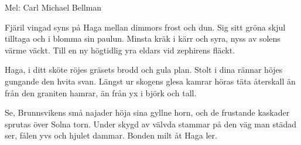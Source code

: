 \begin{SongText}
\begin{SongInfo}
    Mel: Carl Michael Bellman
\end{SongInfo}
\begin{SongVerse}
Fjäril vingad syns på Haga
mellan dimmors frost och dun.
Sig sitt gröna skjul tilltaga
och i blomma sin paulun.
Minsta kräk i kärr och syra,
nyss av solens värme väckt.
Till en ny högtidlig yra
eldars vid zephirens fläckt.
\end{SongVerse}
\begin{SongVerse}
Haga, i ditt sköte röjes
gräsets brodd och gula plan.
Stolt i dina rännar höjes
gungande den hvita svan.
Längst ur skogens glesa kamrar
höras täta återskall
än från den graniten hamrar,
än från yx i björk och tall.
\end{SongVerse}
\begin{SongVerse}
Se, Brunnsvikens små najader
höja sina gyllne horn,
och de frustande kaskader
sprutas över Solna torn.
Under skygd av välvda stammar
på den väg man städad ser,
fålen yvs och hjulet dammar.
Bonden milt åt Haga ler. 
\end{SongVerse}
\end{SongText}
